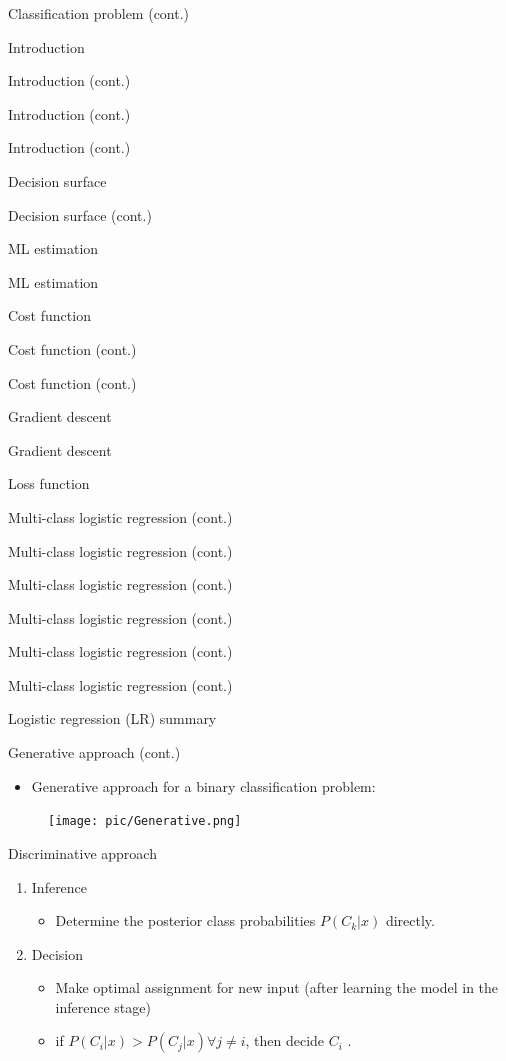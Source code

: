 \documentclass[serif, aspectratio=169]{beamer}
\begin{document}
\begin{frame}{Classification problem (cont.)}
\begin{itemize}
\begin{frame}{Introduction}
\begin{itemize}
\begin{frame}{Introduction (cont.)}
\begin{frame}{Introduction (cont.)}
\begin{frame}{Introduction (cont.)}
\begin{frame}{Decision surface}
\begin{itemize}
\begin{frame}{Decision surface (cont.)}
\begin{frame}{ML estimation}
\begin{frame}{ML estimation}
\begin{itemize}
\begin{frame}{Cost function}
\begin{frame}{Cost function (cont.)}
\begin{itemize}
\begin{itemize}
\begin{frame}{Cost function (cont.)}
\begin{frame}{Gradient descent}
\begin{frame}{Gradient descent}
\begin{frame}{Loss function}
\begin{frame}{Multi-class logistic regression (cont.)}
\begin{frame}{Multi-class logistic regression (cont.)}
\begin{frame}{Multi-class logistic regression (cont.)}
\begin{frame}{Multi-class logistic regression (cont.)}
\begin{frame}{Multi-class logistic regression (cont.)}
\begin{frame}{Multi-class logistic regression (cont.)}
\begin{frame}{Logistic regression (LR) summary}
\begin{itemize}
\begin{frame}{Generative approach (cont.)}
    \begin{itemize}
        \item Generative approach for a binary classification problem:
    \end{itemize}
    \begin{figure}[h]
      \centering
      \texttt{[image: pic/Generative.png]}
      \end{figure}
    \vfill
\end{frame}
\begin{frame}{Discriminative approach}
    \begin{enumerate}
        \item Inference
        \begin{itemize}
            \item Determine the posterior class probabilities $P(C_k|x)$ directly.
        \end{itemize}
        \item Decision
        \begin{itemize}
            \item Make optimal assignment for new input (after learning the model in the inference stage)
            \item if $P(C_i|x) > P(C_j|x) \forall j \neq i$, then decide $C_i$ .
        \end{itemize}
    \end{enumerate}
\end{frame}

\end{itemize}
\end{frame}
\end{frame}
\end{frame}
\end{frame}
\end{frame}
\end{frame}
\end{frame}
\end{frame}
\end{frame}
\end{frame}
\end{frame}
\end{itemize}
\end{itemize}
\end{frame}
\end{frame}
\end{itemize}
\end{frame}
\end{frame}
\end{frame}
\end{itemize}
\end{frame}
\end{frame}
\end{frame}
\end{frame}
\end{itemize}
\end{frame}
\end{itemize}
\end{frame}
\end{document}
